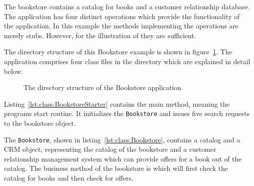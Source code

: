 \noindent The bookstore contains a catalog for books and a customer relationship database. The application has four distinct operations which provide the functionality of the application. In this example the methods implementing the operations are merely stubs. However, for the illustration of \Kieker{} they are sufficient.

The directory structure of this Bookstore example is shown in figure~\ref{fig:PlainBookstoreExample}. The application comprises four class files in the  directory which are explained in detail below.

\begin{figure}[H]
\begin{graybox}
\end{graybox}

\caption{The directory structure of the Bookstore application}
\label{fig:PlainBookstoreExample}
\end{figure}

\noindent Listing~\ref{lst:class:BookstoreStarter} contains the main method, meaning the programs start routine. It initializes the \verb!Bookstore! and issues five search requests to the bookstore object.

\setJavaCodeListing







\noindent The \verb!Bookstore!, shown in listing~\ref{lst:class:Bookstore}, contains a catalog and a CRM object, representing the catalog of the bookstore and a customer relationship management system which can provide offers for a book out of the catalog. The business method of the bookstore is  which will first check the catalog for books and then check for offers.

